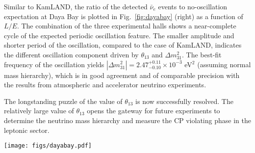 Similar to KamLAND, the ratio of the detected $\bar\nu_{e}$ events to no-oscillation expectation at Daya Bay is plotted in Fig.~\ref{fig:dayabay} (right) as a function of $L/E$. The combination of the three experimental halls shows a near-complete cycle of the expected periodic oscillation feature. The smaller amplitude and shorter period of the oscillation, compared to the case of KamLAND, indicates the different oscillation component driven by $\theta_{13}$ and $\Delta{m}^2_{31}$. The best-fit frequency of the oscillation yields $|\Delta{m}^2_{31}| = 2.47^{+0.11}_{-0.10} \times 10^{-3}$ eV$^2$ (assuming normal mass hierarchy), which is in good agreement and of comparable precision with the results from atmospheric and accelerator neutrino experiments. 

The longstanding puzzle of the value of $\theta_{13}$ is now successfully resolved. The relatively large value of $\theta_{13}$ opens the gateway for future experiments to determine the neutrino mass hierarchy and measure the CP violating phase in the leptonic sector.

\begin{figure*}[htb] \label{fig:dayabay}
  \centering
  \texttt{[image: figs/dayabay.pdf]}
  \caption{Daya Bay results: (left) Ratio of the detected versus expected $\bar\nu_{e}$ signals at the 8 antineutrino detectors (ADs) located in three experimental halls.  The oscillation survival probability at the best-fit value is given by the red curve.
  (right) Ratio of the background-subtracted $\bar\nu_e$ spectrum to the expectation for no-oscillation in the three experimental halls, re-expressed as a function of $L_{\textrm{eff}}/E_{\nu}$. The effective baseline $L_{\textrm{eff}}$ is determined for each experimental hall (EH) to an effective oscillated flux from a single baseline. The oscillation survival probability using the best estimates of $\theta_{13}$ and $|\Delta{m}^2_{31}|$ is given by the red curve.}
\end{figure*}





